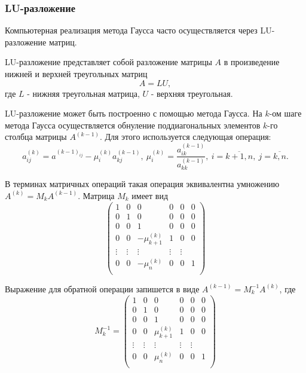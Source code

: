 \documentclass[a4paper,12pt]{article}
\begin{document}
\subsubsection{LU-разложение}
Компьютерная реализация метода Гаусса часто осуществляется
через LU-разложение матриц.

LU-разложение  представляет собой разложение матрицы $A$ в
произведение нижней и верхней треугольных матриц
$$
A = LU,
$$
где $L$ - нижняя треугольная матрица, $U$ - верхняя треугольная.

LU-разложение может быть построенно с помощью метода Гаусса.
На $k$-ом шаге метода Гаусса осуществляется обнуление
поддиагональных элементов $k$-го столбца матрицы $A^{(k - 1)}$.
Для этого используется следующая операция:
$$a^{(k)}_{ij} = a^{(k - 1)_{ij}} - \mu_i^{(k)} a_{kj}^{(k - 1)},
\ \mu_i^{(k)} = \frac{a_{ik}^{(k - 1)}}{a_{kk}^{(k - 1)}},
\ i = \overline{k + 1, n},\ j = \overline{k, n}.$$

В терминах матричных операций такая операция эквивалентна
умножению $A^{(k)} = M_k A^{(k - 1)}$. Матрица $M_k$ имеет вид
$$
\begin{pmatrix}
    1 & 0 & 0 & 0 & 0 & 0 \\
    0 & 1 & 0 & 0 & 0 & 0 \\
    0 & 0 & 1 & 0 & 0 & 0 \\
    0 & 0 & -\mu_{k+1}^{(k)} & 1 & 0 & 0 \\
    \vdots & \vdots & \vdots & \vdots & \vdots \\
    0 & 0 & -\mu_{n}^{(k)} & 0 & 0 & 1 \\
\end{pmatrix}
$$

Выражение для обратной операции запишется в виде
$A^{(k-1)} = M^{-1}_k A^{(k)}$, где
$$
M_k^{-1} =
\begin{pmatrix}
    1 & 0 & 0 & 0 & 0 & 0 \\
    0 & 1 & 0 & 0 & 0 & 0 \\
    0 & 0 & 1 & 0 & 0 & 0 \\
    0 & 0 & \mu_{k+1}^{(k)} & 1 & 0 & 0 \\
    \vdots & \vdots & \vdots & \vdots & \vdots \\
    0 & 0 & \mu_{n}^{(k)} & 0 & 0 & 1 \\
\end{pmatrix}
$$
\end{document}
